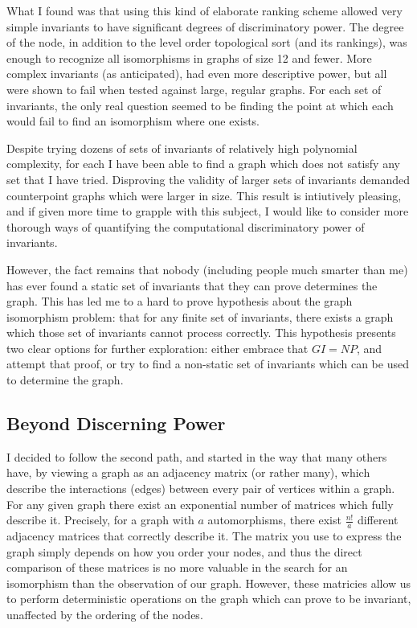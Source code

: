\documentclass[a4paper,12pt]{article}
\begin{document}
What I found was that using this kind of elaborate ranking scheme allowed very simple invariants to
have significant degrees of discriminatory power.  The degree of the node, in addition to the level
order topological sort (and its rankings), was enough to recognize all isomorphisms in graphs of 
size 12 and fewer. More complex invariants (as anticipated), had even more descriptive power,
but all were shown to fail when tested against large, regular graphs. For each set of invariants, the
only real question seemed to be finding the point at which each would fail to find an isomorphism
where one exists.

Despite trying dozens of sets of invariants of relatively high polynomial complexity,
for each I have been able to find a graph which does not satisfy any set that I have tried. 
Disproving the validity of larger sets of invariants demanded
counterpoint graphs which were larger in size. This result is intiutively pleasing,
and if given more time to grapple with this subject, I would like to consider more thorough
ways of quantifying the computational discriminatory power of invariants.

However, the fact remains that nobody (including people much smarter than me) has
ever found a static set of invariants that they can prove determines the graph.
This has led me to a hard to prove hypothesis about the graph isomorphism problem:
that for any finite set of invariants, there exists a graph which those set of invariants cannot process correctly. 
This hypothesis presents two clear options for further exploration: either embrace that \(GI = NP\), and attempt
that proof, or try to find a non-static set of invariants which can be used to determine the graph. 

\subsection*{Beyond Discerning Power}

I decided to follow the second path, and started in the way that many others have, by viewing a graph
as an adjacency matrix (or rather many), which describe the interactions (edges)
between every pair of vertices within a graph.  For any given graph there exist an exponential
number of matrices which fully describe it. Precisely, for a graph with \(a\) automorphisms,
there exist \(\frac{n!}{a}\) different adjacency matrices that correctly describe it. 
The matrix you use to express the graph simply depends on how you order your nodes, and thus the direct 
comparison of these matrices is no more valuable in the search for an isomorphism
than the observation of our graph.  However, these matricies allow us to perform
deterministic operations on the graph which can prove to be invariant, 
unaffected by the ordering of the nodes.
\end{document}
